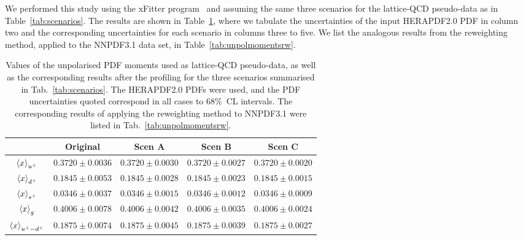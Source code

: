 We performed this study using the xFitter program~\cite{Alekhin:2014irh}
and assuming the same three scenarios for the lattice-QCD pseudo-data as 
in Table~\ref{tab:scenarios}. 
%
The results are shown in Table~\ref{tab:unpolmomentsProf}, where we tabulate 
the uncertainties of the input HERAPDF2.0 PDF in column two and the 
corresponding uncertainties for each scenario in columns three to five. 
%
We list the analogous results from the reweighting method, applied to the 
NNPDF3.1 data set, in Table~\ref{tab:unpolmomentsrw}.


\begin{table}[h]
  \centering
  \renewcommand{\arraystretch}{1.3} 
\begin{tabular}{c||c|c|c|c}
  \hline &  Original  & Scen A  &  Scen B  &  Scen C  \\
  \hline
  \hline
  $\left\langle x\right\rangle_{u^+}$     &  $0.3720\pm 0.0036$  &  $0.3720\pm 0.0030$  &  $0.3720\pm 0.0027$  &  $0.3720\pm 0.0020$ \\
  $\left\langle x\right\rangle_{d^+}$     &  $0.1845\pm 0.0053$  &  $0.1845\pm 0.0028$  &  $0.1845\pm 0.0023$  &  $0.1845\pm 0.0015$ \\
  $\left\langle x\right\rangle_{s^+}$     &  $0.0346\pm 0.0037$  &  $0.0346\pm 0.0015$  &  $0.0346\pm 0.0012$  &  $0.0346\pm 0.0009$ \\
  $\left\langle x\right\rangle_{g}$       &  $0.4006\pm 0.0078$  &  $0.4006\pm 0.0042$  &  $0.4006\pm 0.0035$  &  $0.4006\pm 0.0024$ \\
  $\left\langle x\right\rangle_{u^+-d^+}$ &  $0.1875\pm 0.0074$  &  $0.1875\pm 0.0045$  &  $0.1875\pm 0.0039$  &  $0.1875\pm 0.0027$ \\
  \hline
\end{tabular}
\caption{\small Values of the unpolarised PDF moments
  used as lattice-QCD pseudo-data, as well as the corresponding results
  after the profiling  for the
three scenarios summarised in Tab.~\ref{tab:scenarios}.
%
The HERAPDF2.0 PDFs were used, and the PDF uncertainties quoted correspond in all cases to 68\%~CL intervals.
%
The corresponding results of applying the reweighting method
to NNPDF3.1 were listed in Tab.~\ref{tab:unpolmomentsrw}.
\label{tab:unpolmomentsProf}
}
\end{table}

